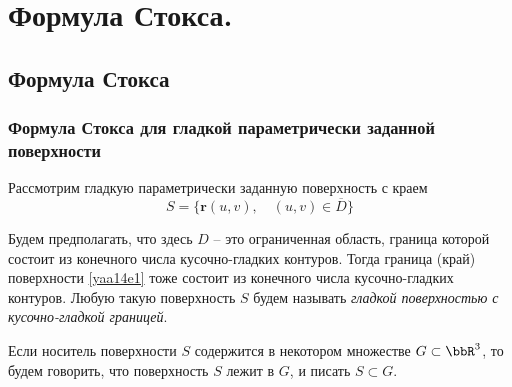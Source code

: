 \chapter{Формула Стокса.}
\section{Формула Стокса}
\subsection{Формула Стокса для гладкой параметрически заданной поверхности}
Рассмотрим гладкую параметрически заданную поверхность с краем
\begin{equation} \label{yaa14e1}
S=\{\mathbf{r}(u,v),\quad(u,v)\in\overline{D} \}
\end{equation}

Будем предполагать, что здесь $D$ -- это ограниченная область, граница которой состоит из конечного числа кусочно-гладких контуров. Тогда граница (край) поверхности \eqref{yaa14e1} тоже состоит из конечного числа кусочно-гладких контуров. Любую такую поверхность $S$ будем называть \textit{гладкой поверхностью с кусочно-гладкой границей}.

Если носитель поверхности $S$ содержится в некотором множестве $G\subset \bbR^3$, то будем говорить, что поверхность $S$ лежит в $G$, и писать $S\subset G$.


